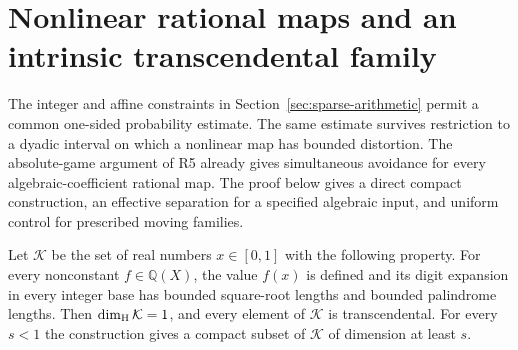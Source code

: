 \section{Nonlinear rational maps and an intrinsic transcendental family}
\label{sec:nonlinear}

The integer and affine constraints in Section~\ref{sec:sparse-arithmetic} permit a common one-sided probability estimate. The same estimate survives restriction to a dyadic interval on which a nonlinear map has bounded distortion. The absolute-game argument of R5 already gives simultaneous avoidance for every algebraic-coefficient rational map. The proof below gives a direct compact construction, an effective separation for a specified algebraic input, and uniform control for prescribed moving families.

\begin{theorem}\label{thm:nonlinear}
Let $\mathcal K$ be the set of real numbers $x\in[0,1]$ with the following property. For every nonconstant $f\in\mathbb Q(X)$, the value $f(x)$ is defined and its digit expansion in every integer base has bounded square-root lengths and bounded palindrome lengths. Then $\dim_{\rm H}\mathcal K=1$, and every element of $\mathcal K$ is transcendental. For every $s<1$ the construction gives a compact subset of $\mathcal K$ of dimension at least $s$.
\end{theorem}

